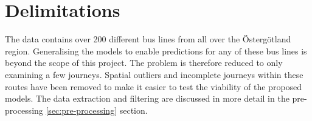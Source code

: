 \section{Delimitations}
\label{sec:delimitations}

The data contains over 200 different bus lines from all over the Östergötland region. Generalising the models to enable predictions for any of these bus lines is beyond the scope of this project. The problem is therefore reduced to only examining a few journeys. Spatial outliers and incomplete journeys within these routes have been removed to make it easier to test the viability of the proposed models. The data extraction and filtering are discussed in more detail in the pre-processing \ref{sec:pre-processing} section.




